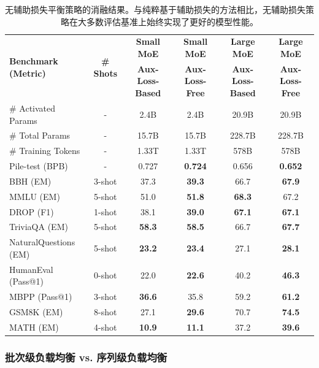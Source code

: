 \documentclass[lang=cn,a4paper,newtx]{elegantpaper}
\begin{document}
\begin{table}[t]
    \centering
    \footnotesize
    \setlength{\tabcolsep}{4pt}
    \begin{tabular}{@{}l c | c c | c c@{}}
    \toprule
    \multirow{2}{*}{\centering \textbf{Benchmark (Metric)}} & \multirow{2}{*}{\textbf{\# Shots}} & \textbf{Small MoE} & \textbf{Small MoE} & \textbf{Large MoE} & \textbf{Large MoE} \\
     & & \textbf{Aux-Loss-Based} & \textbf{Aux-Loss-Free} & \textbf{Aux-Loss-Based} & \textbf{Aux-Loss-Free} \\
    \midrule
    \# Activated Params & - & 2.4B & 2.4B & 20.9B & 20.9B \\
    \# Total Params & - & 15.7B & 15.7B & 228.7B & 228.7B \\
    \# Training Tokens & - & 1.33T & 1.33T & 578B & 578B \\
    \midrule
    Pile-test {\tiny (BPB)} & - & 0.727 & \textbf{0.724} & 0.656 & \textbf{0.652} \\
    BBH {\tiny (EM)} & 3-shot & 37.3 & \textbf{39.3} & 66.7 & \textbf{67.9} \\
    MMLU {\tiny (EM)} & 5-shot & 51.0 & \textbf{51.8} & \textbf{68.3} & 67.2 \\
    DROP {\tiny (F1)} & 1-shot & 38.1 & \textbf{39.0} & \textbf{67.1} & \textbf{67.1} \\
    TriviaQA {\tiny (EM)} & 5-shot & \textbf{58.3} & \textbf{58.5} & 66.7 & \textbf{67.7} \\
    NaturalQuestions {\tiny (EM)} & 5-shot & \textbf{23.2} & \textbf{23.4} & 27.1 & \textbf{28.1} \\
    HumanEval {\tiny (Pass@1)} & 0-shot & 22.0 & \textbf{22.6} & 40.2 & \textbf{46.3} \\
    MBPP {\tiny (Pass@1)} & 3-shot & \textbf{36.6} & 35.8 & 59.2 & \textbf{61.2} \\
    GSM8K {\tiny (EM)} & 8-shot & 27.1 & \textbf{29.6} & 70.7 & \textbf{74.5} \\
    MATH {\tiny (EM)} & 4-shot & \textbf{10.9} & \textbf{11.1} & 37.2 & \textbf{39.6} \\
    \bottomrule
    \end{tabular}
    \caption{无辅助损失平衡策略的消融结果。与纯粹基于辅助损失的方法相比，无辅助损失策略在大多数评估基准上始终实现了更好的模型性能。}
    \label{tab:ablation_noaux_tc}
\end{table}

\subsubsection{批次级负载均衡 vs. 序列级负载均衡}
\label{discussion:balance}
\end{document}
